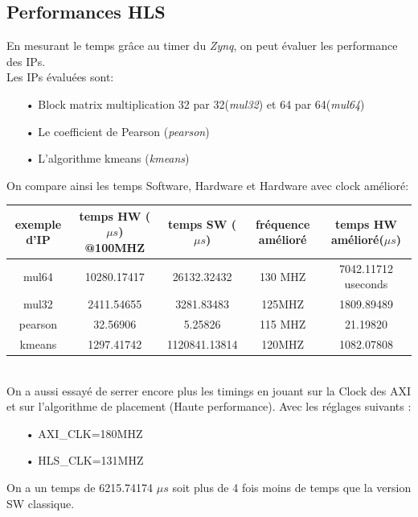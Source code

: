 \documentclass[12pt,a4paper]{article}
\begin{document}
\subsection{Performances HLS}
En mesurant le temps grâce au timer du \textit{Zynq}, on peut évaluer les performance des IPs.\\
Les IPs évaluées sont:
\begin{itemize}
	\item[•]Block matrix multiplication 32 par 32(\textit{mul32}) et 64 par 64(\textit{mul64})
	\item[•]Le coefficient de Pearson (\textit{pearson})
	\item[•]L'algorithme kmeans (\textit{kmeans})
\end{itemize}
\bigskip
On compare ainsi les temps Software, Hardware et Hardware avec clock amélioré:\\
\bigskip
\begin{tabular}{|c|c|c|c|c|}
	\hline
	\scriptsize exemple d'IP & \scriptsize temps HW ($\mu s$) @100MHZ & \scriptsize temps SW ($\mu s$) & \scriptsize fréquence amélioré & \scriptsize temps HW amélioré($\mu s$) \\ \hline
	mul64           &              10280.17417               &          26132.32432           &            130 MHZ             &          7042.11712 useconds           \\
	mul32           &               2411.54655               &           3281.83483           &             125MHZ             &               1809.89489               \\
	pearson          &                32.56906                &            5.25826             &            115 MHZ             &                21.19820                \\
	kmeans          &               1297.41742               &         1120841.13814          &             120MHZ             &               1082.07808               \\ \hline
\end{tabular}\\
\bigskip
On a aussi essayé de serrer encore plus les timings en jouant sur la Clock des AXI et sur l'algorithme de placement (Haute performance). Avec les réglages suivants : 
\begin{itemize}
	\item[•]AXI\_CLK=180MHZ
	\item[•]HLS\_CLK=131MHZ
\end{itemize}
On a un temps de 6215.74174 $\mu s$ soit plus de 4 fois moins de temps que la version SW classique.
\end{document}
